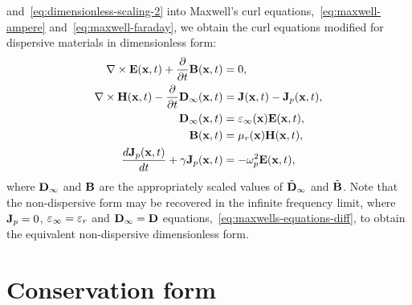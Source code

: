 and~\eqref{eq:dimensionless-scaling-2} into Maxwell's curl
equations,~\eqref{eq:maxwell-ampere} and~\eqref{eq:maxwell-faraday}, we obtain
the curl equations modified for dispersive materials in dimensionless form:
\begin{subequations}
  \label{eq:dimensionless-maxwell}
  \begin{align}
    \nabla \times \mathbf{E}(\mathbf{x},t) + \frac{\partial}{\partial t} \mathbf{B}(\mathbf{x}, t) &= 0, \\
    \nabla \times \mathbf{H}(\mathbf{x},t) - \frac{\partial}{\partial t}  \mathbf{D}_{\infty}(\mathbf{x}, t) &= \mathbf{J}(\mathbf{x},t) - \mathbf{J}_p(\mathbf{x},t), \\
    \mathbf{D}_{\infty}(\mathbf{x},t) &= \varepsilon_{\infty}(\mathbf{x}) \mathbf{E}(\mathbf{x},t), \\
    \mathbf{B}(\mathbf{x},t) &= \mu_r(\mathbf{x}) \mathbf{H}(\mathbf{x},t), \\
    \frac{d \mathbf{J}_p(\mathbf{x},t)}{dt} + \gamma \mathbf{J}_p(\mathbf{x},t) &= - \omega_p^2 \mathbf{E}(\mathbf{x},t),
  \end{align}
\end{subequations}
where $\mathbf{D}_{\infty}$ and $\mathbf{B}$ are the appropriately scaled values of
$\tilde{\mathbf{D}}_{\infty}$ and $\tilde{\mathbf{B}}$.
Note that the non-dispersive form may be recovered in
the infinite frequency limit, where $\mathbf{J}_p = 0$, $\varepsilon_{\infty} = \varepsilon_r$
and $\mathbf{D}_{\infty} = \mathbf{D}$
equations,~\eqref{eq:maxwells-equations-diff}, to obtain the equivalent
non-dispersive dimensionless form.

\section{Conservation form}

